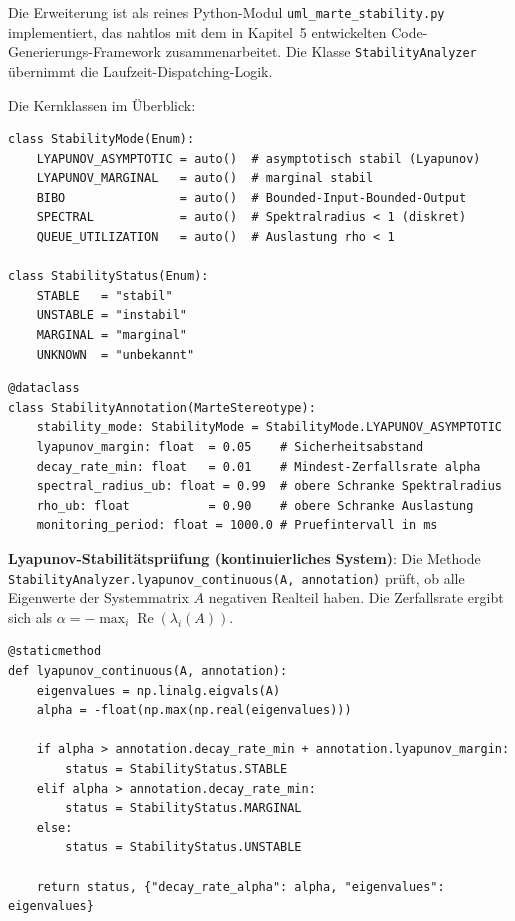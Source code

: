 ﻿\documentclass[a4paper,12pt]{scrreprt}
\theoremstyle{definition}
\begin{document}
Die Erweiterung ist als reines Python-Modul
\texttt{uml\_marte\_stability.py} implementiert, das nahtlos mit dem in
Kapitel~5 entwickelten Code-Generierungs-Framework zusammenarbeitet. Die
Klasse \texttt{StabilityAnalyzer} übernimmt die Laufzeit-Dispatching-Logik.

Die Kernklassen im Überblick:
\begin{lstlisting}[style=python,
	caption={Enum-Typen für Stabilitätsmodi und -status},
	label={lst:stability-enums}]
class StabilityMode(Enum):
	LYAPUNOV_ASYMPTOTIC = auto()  # asymptotisch stabil (Lyapunov)
	LYAPUNOV_MARGINAL   = auto()  # marginal stabil
	BIBO                = auto()  # Bounded-Input-Bounded-Output
	SPECTRAL            = auto()  # Spektralradius < 1 (diskret)
	QUEUE_UTILIZATION   = auto()  # Auslastung rho < 1
	
class StabilityStatus(Enum):
	STABLE   = "stabil"
	UNSTABLE = "instabil"
	MARGINAL = "marginal"
	UNKNOWN  = "unbekannt"
\end{lstlisting}

\begin{lstlisting}[style=python,
	caption={Stereotyp \texttt{<<StabilityAnnotation>>} als Python-Dataclass},
	label={lst:stability-annotation-class}]
@dataclass
class StabilityAnnotation(MarteStereotype):
	stability_mode: StabilityMode = StabilityMode.LYAPUNOV_ASYMPTOTIC
	lyapunov_margin: float  = 0.05    # Sicherheitsabstand
	decay_rate_min: float   = 0.01    # Mindest-Zerfallsrate alpha
	spectral_radius_ub: float = 0.99  # obere Schranke Spektralradius
	rho_ub: float           = 0.90    # obere Schranke Auslastung
	monitoring_period: float = 1000.0 # Pruefintervall in ms
\end{lstlisting}

\textbf{Lyapunov-Stabilitätsprüfung (kontinuierliches System)}:
Die Methode \texttt{Stabili\newline tyAnalyzer.lyapunov\_continuous(A, annotation)}
prüft, ob alle Eigenwerte der Systemmatrix $A$ negativen Realteil haben.
Die Zerfallsrate ergibt sich als
$\alpha = -\max_i \operatorname{Re}(\lambda_i(A))$.

\begin{lstlisting}[style=python,
	caption={Lyapunov-Stabilitätsprüfung via Eigenwertanalyse},
	label={lst:lyapunov}]
@staticmethod
def lyapunov_continuous(A, annotation):
	eigenvalues = np.linalg.eigvals(A)
	alpha = -float(np.max(np.real(eigenvalues)))
	
	if alpha > annotation.decay_rate_min + annotation.lyapunov_margin:
		status = StabilityStatus.STABLE
	elif alpha > annotation.decay_rate_min:
		status = StabilityStatus.MARGINAL
	else:
		status = StabilityStatus.UNSTABLE
	
	return status, {"decay_rate_alpha": alpha, "eigenvalues": eigenvalues}
\end{lstlisting}
\end{document}
